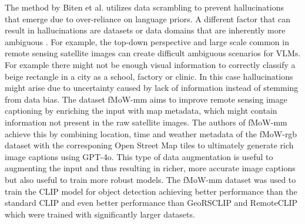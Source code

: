 The method by Biten et al. utilizes data scrambling to prevent hallucinations that emerge due to over-reliance on language priors. A different factor that can result in hallucinations are datasets or data domains that are inherently more ambiguous \autocite{andersonMeasuringMitigatingHallucinations2025}. For example, the top-down perspective and large scale common in remote sensing satellite images can create difficult ambiguous scenarios for VLMs. For example there might not be enough visual information to correctly classify a beige rectangle in a city as a school, factory or clinic. In this case hallucinations might arise due to uncertainty caused by lack of information instead of stemming from data bias. The dataset fMoW-mm \autocite{andersonMeasuringMitigatingHallucinations2025} aims to improve remote sensing image captioning by enriching the input with map metadata, which might contain information not present in the raw satellite images. The authors of fMoW-mm achieve this by combining location, time and weather metadata of the fMoW-rgb dataset with the corresponing Open Street Map tiles to ultimately generate rich image captions using GPT-4o. This type of data augmentation is useful to augmenting the input and thus resulting in richer, more accurate image captions but also useful to train more robust models. The fMoW-mm dataset was used to train the CLIP \autocite{radfordLearningTransferableVisual2021} model for object detection achieving better performance than the standard CLIP and even better performance than GeoRSCLIP\autocite{zhangRS5MGeoRSCLIPLarge2024} and RemoteCLIP \autocite{liuRemoteCLIPVisionLanguage2024a} which were trained with significantly larger datasets.

